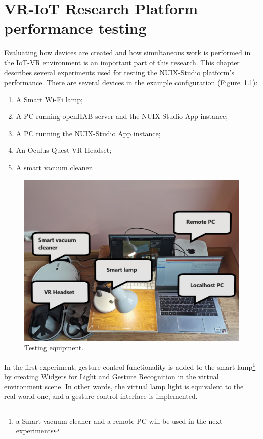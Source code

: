 
\chapter{VR-IoT Research Platform performance testing}

Evaluating how devices are created and how simultaneous work is performed in the IoT-VR environment is an important part of this research. This chapter describes several experiments used for testing the NUIX-Studio platform's performance.
There are several devices in the example configuration (Figure~\ref{fig:TestingEquipment-figure}):
\begin{enumerate}
    \item A Smart Wi-Fi lamp;
    \item A PC running openHAB server and the NUIX-Studio App instance;
    \item A PC running the NUIX-Studio App instance;
    \item An Oculus Quest VR Headset;
    \item A smart vacuum cleaner.
\end{enumerate}

\begin{figure}
  \centering
  \includegraphics[width = 0.9 \linewidth]{figures/TestingEquipment.png}
  \caption{Testing equipment.}
  \label{fig:TestingEquipment-figure}
\end{figure}

In the first experiment, gesture control functionality is added to the smart lamp\footnote{a Smart vacuum cleaner and a remote PC will be used in the next experiments} by creating Widgets for Light and Gesture Recognition in the virtual environment scene. In other words, the virtual lamp light is equivalent to the real-world one, and a gesture control interface is implemented.

